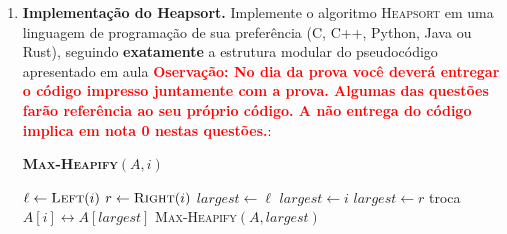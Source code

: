 \documentclass[9pt,a4paper]{extarticle}
\begin{document}
\begin{enumerate}[resume]
    Considere $n = r - p + 1$ o tamanho do subarranjo na chamada corrente.

    \begin{enumerate}
        \item Identifique os passos de \textbf{dividir}, \textbf{conquistar} e \textbf{combinar} no algoritmo, no espírito do paradigma de divisão e conquista.
        \item Escreva a relação de recorrência $T(n)$, justificando o número de chamadas recursivas, o tamanho de cada subproblema e o custo de combinar os resultados.
        \item Resolva a recorrência pelo método da árvore de recursão para $n = 2^k$. Indique o número de níveis, o custo por nível e o custo total.
        \item Mostre que $T(n) = \Theta(n)$.
        \item Aplique o Teorema Mestre para confirmar o resultado obtido pela árvore de recursão. Identifique $a$, $b$ e $f(n)$, e indique qual caso do teorema se aplica.
        \item Compare a classe assintótica deste algoritmo com a de uma versão iterativa que percorre o arranjo uma única vez. O que isto sugere sobre o ganho (ou ausência de ganho) ao usar divisão e conquista neste problema?
    \end{enumerate} 



    \item \textbf{Implementação do Heapsort.} Implemente o algoritmo \textsc{Heapsort} em uma linguagem de programação de sua preferência (C, C++, Python, Java ou Rust), seguindo \textbf{exatamente} a estrutura modular do pseudocódigo apresentado em aula \textbf{\textcolor{red}{Oservação: No dia da prova você deverá entregar o código impresso juntamente com a prova. Algumas das questões farão referência ao seu próprio código. A não entrega do código implica em nota 0 nestas questões.}}:

    \begin{center}
    \begin{minipage}{0.7\textwidth}
    \textbf{\textsc{Max-Heapify}}$(A, i)$
    \begin{algorithmic}[1]
        \State $\ell \gets \textsc{Left}(i)$
        \State $r \gets \textsc{Right}(i)$
            \State $\textit{largest} \gets \ell$
        \Else
            \State $\textit{largest} \gets i$
        \EndIf
            \State $\textit{largest} \gets r$
        \EndIf
            \State troca $A[i] \leftrightarrow A[\textit{largest}]$
            \State \textsc{Max-Heapify}$(A, \textit{largest})$
        \EndIf
    \end{algorithmic}
    \end{minipage}
    \end{center}


\end{enumerate}
\end{document}
